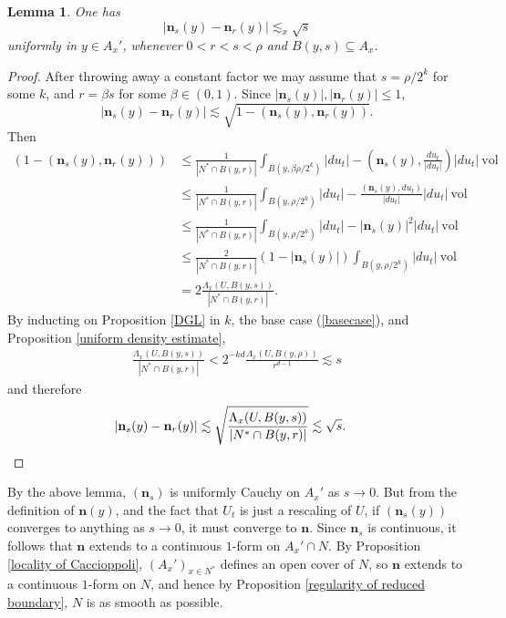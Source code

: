 \documentclass[reqno,12pt,letterpaper]{amsart}
\newcommand{\normal}{\mathbf n}
\newcommand{\vol}{\mathrm{vol}}
\newtheorem{lemma}[theorem]{Lemma}
\theoremstyle{definition}
\numberwithin{equation}{section}
\begin{document}
\begin{lemma}
One has
$$|\normal_s(y) - \normal_r(y)| \lesssim_x \sqrt s$$
uniformly in $y \in A_x'$, whenever $0 < r < s < \rho$ and $B(y, s) \subseteq A_x$.
\end{lemma}
\begin{proof}
After throwing away a constant factor we may assume that $s = \rho/2^k$ for some $k$, and $r = \beta s$ for some $\beta \in (0, 1)$.
Since $|\normal_s(y)|,|\normal_r(y)| \leq 1$,
$$|\normal_s(y) - \normal_r(y)| \lesssim \sqrt{1 - (\normal_s(y), \normal_r(y))}.$$
Then
\begin{align*}
(1 - (\normal_s(y), \normal_r(y)))  &\leq \frac{1}{|N^* \cap B(y, r)|} \int_{B(y, \beta \rho/2^k)} |du_t| - \left(\normal_s(y), \frac{du_t}{|du_t|}\right) |du_t| ~\vol\\
&\leq \frac{1}{|N^* \cap B(y, r)|} \int_{B(y, \rho/2^k)} |du_t| - \frac{(\normal_s(y), du_t)}{|du_t|} |du_t| ~\vol \\
&\leq \frac{1}{|N^* \cap B(y, r)|} \int_{B(y, \rho/2^k)} |du_t| - |\normal_s(y)|^2 |du_t| ~\vol\\
&\leq \frac{2}{|N^* \cap B(y, r)|} (1 - |\normal_s(y)|)\int_{B(y, \rho/2^k)} |du_t| ~\vol\\
&= 2\frac{\Lambda_x(U, B(y, s))}{|N^* \cap B(y, r)|}.
\end{align*}
By inducting on Proposition \ref{DGL} in $k$, the base case (\ref{basecase}), and Proposition \ref{uniform density estimate},
\begin{align*}
\frac{\Lambda_x(U, B(y, s))}{|N^* \cap B(y, r)|} < 2^{-kd} \frac{\Lambda_x(U, B(y, \rho))}{r^{d - 1}} \lesssim s
\end{align*}
and therefore
\begin{align*}
|\normal_s(y) - \normal_r(y)| &\lesssim \sqrt{\frac{\Lambda_x(U, B(y, s))}{|N^* \cap B(y, r)|}} \lesssim \sqrt s. \qedhere
\end{align*}
\end{proof}

By the above lemma, $(\normal_s)$ is uniformly Cauchy on $A_x'$ as $s \to 0$.
But from the definition of $\normal(y)$, and the fact that $U_t$ is just a rescaling of $U$, if $(\normal_s(y))$ converges to anything as $s \to 0$, it must converge to $\normal$.
Since $\normal_s$ is continuous, it follows that $\normal$ extends to a continuous $1$-form on $A_x' \cap N$.
By Proposition \ref{locality of Caccioppoli}, $(A_x')_{x \in N^*}$ defines an open cover of $N$, so $\normal$ extends to a continuous $1$-form on $N$, and hence by Proposition \ref{regularity of reduced boundary}, $N$ is as smooth as possible.
\end{document}
